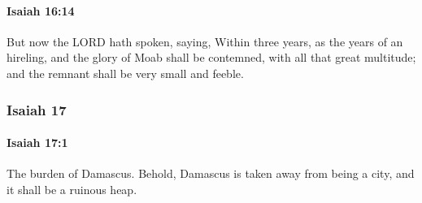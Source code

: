 		\paragraph{Isaiah 16:14} %
			\label{ISAIAH-16-14}

			But now the LORD hath spoken, saying, Within three years, as the years of an hireling, and the glory of Moab shall be contemned, with all that great multitude; and the remnant shall be very small and feeble.

	\subsubsection{Isaiah 17} %
		\label{ISAIAH-17}

		\paragraph{Isaiah 17:1} %
			\label{ISAIAH-17-1}

			The burden of Damascus. Behold, Damascus is taken away from being a city, and it shall be a ruinous heap.

